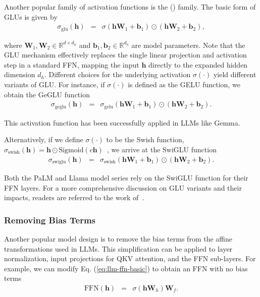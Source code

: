 Another popular family of activation functions is the  () family. The basic form of GLUs is given by
\begin{eqnarray}
\sigma_{\mathrm{glu}}(\mathbf{h}) & = & \sigma(\mathbf{h}\mathbf{W}_1 + \mathbf{b}_1) \odot (\mathbf{h}\mathbf{W}_2 + \mathbf{b}_2),
\end{eqnarray}

\noindent where $\mathbf{W}_1, \mathbf{W}_2 \in \mathbb{R}^{d \times d_h}$ and $\mathbf{b}_1, \mathbf{b}_2 \in \mathbb{R}^{d_h}$ are model parameters. Note that the GLU mechanism effectively replaces the single linear projection and activation step in a standard FFN, mapping the input $\mathbf{h}$ directly to the expanded hidden dimension $d_h$. Different choices for the underlying activation $\sigma(\cdot)$ yield different variants of GLU. For instance, if $\sigma(\cdot)$ is defined as the GELU function, we obtain the GeGLU function
\begin{eqnarray}
\sigma_{\mathrm{geglu}}(\mathbf{h}) & = & \sigma_{\mathrm{gelu}}(\mathbf{h}\mathbf{W}_1 + \mathbf{b}_1) \odot (\mathbf{h}\mathbf{W}_2 + \mathbf{b}_2).
\end{eqnarray}

\noindent This activation function has been successfully applied in LLMs like Gemma.

Alternatively, if we define $\sigma(\cdot)$ to be the Swish function, $\sigma_{\mathrm{swish}}(\mathbf{h}) = \mathbf{h} \odot \mathrm{Sigmoid}(c\mathbf{h})$~\cite{ramachandran-etal:2017searching}, we arrive at the SwiGLU function
\begin{eqnarray}
\sigma_{\mathrm{swiglu}}(\mathbf{h}) & = & \sigma_{\mathrm{swish}}(\mathbf{h}\mathbf{W}_1 + \mathbf{b}_1) \odot (\mathbf{h}\mathbf{W}_2 + \mathbf{b}_2).
\end{eqnarray}

\noindent Both the PaLM and Llama model series rely on the SwiGLU function for their FFN layers. For a more comprehensive discussion on GLU variants and their impacts, readers are referred to the work of~\citet{shazeer-etal:2020glu}.

\subsubsection{Removing Bias Terms}

\noindent Another popular model design is to remove the bias terms from the affine transformations used in LLMs. This simplification can be applied to layer normalization, input projections for QKV attention, and the FFN sub-layers. For example, we can modify Eq. (\ref{eq:llm-ffn-basic}) to obtain an FFN with no bias terms
\begin{eqnarray}
\mathrm{FFN}(\mathbf{h}) & = & \sigma(\mathbf{h} \mathbf{W}_h) \mathbf{W}_f.
\end{eqnarray}


